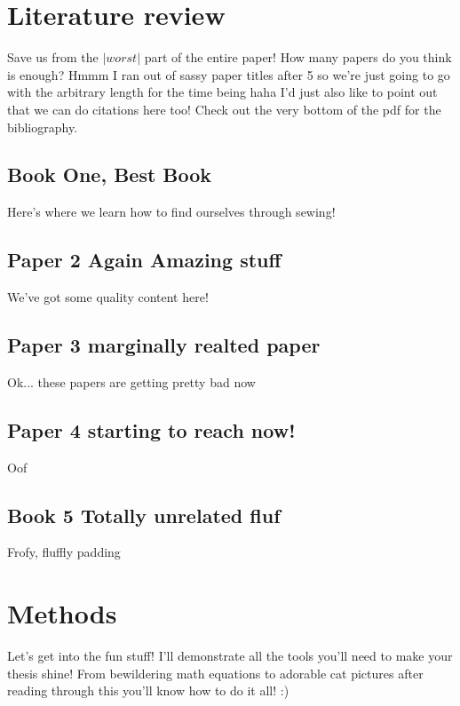 \documentclass[]{article}
\begin{document}
\section{Literature review}
Save us from the $|worst|$ part of the entire paper! How many papers do you think is enough? Hmmm I ran out of sassy paper titles after 5 so we're just going to go with the arbitrary length for the time being haha I'd just also like to point out that we can do citations here too! Check out the very bottom of the pdf for the bibliography. 
\subsection{Book One, Best Book}
Here's where we learn how to find ourselves through sewing! \cite{nancyBook}
\subsection{Paper 2 Again Amazing stuff}
We've got some quality content here! \cite{nancyArticle}
\subsection{Paper 3 marginally realted paper }
Ok... these papers are getting pretty bad now \cite{adamArticle}
\subsection{Paper 4 starting to reach now!}
Oof \cite{adamArticle2}
\subsection{Book 5 Totally unrelated fluf}
Frofy, fluffly padding \cite{adamBook}

\newpage
\section{Methods}
Let's get into the fun stuff! I'll demonstrate all the tools you'll need to make your thesis shine! From bewildering math equations to adorable cat pictures after reading through this you'll know how to do it all! :)
\end{document}
